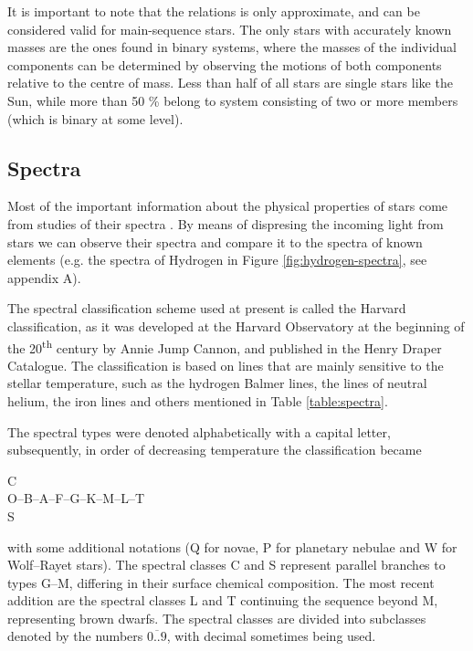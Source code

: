 It is important to note that the relations is only approximate, and can be considered valid for main-sequence stars. The only stars with accurately known masses are the ones found in binary systems, where the masses of the individual components
can be determined by observing the motions of both components relative to the centre of mass. Less than half of all stars are single stars like the Sun, while more than 50 \% belong to system consisting of two or more members (which is binary at some level). 


\subsection{Spectra}

Most of the important information about the physical properties of stars come from studies of their spectra \citep{Karttunen2017}. By means of dispresing the incoming light from stars we can observe their spectra and compare it to the spectra of known elements (e.g. the spectra of Hydrogen in Figure \ref{fig:hydrogen-spectra}, see appendix A). 

The spectral classification scheme used at present is called the Harvard classification, as it was developed at the Harvard Observatory at the beginning of the 20\textsuperscript{th} century by Annie Jump Cannon, and published in the Henry Draper Catalogue. The classification is based on lines that are mainly sensitive to the stellar temperature, such as the hydrogen Balmer lines, the lines of neutral helium, the iron lines and others mentioned in Table \ref{table:spectra}.

The spectral types were denoted alphabetically with a capital letter, subsequently, in order of decreasing temperature the classification became 
\begin{center}
C\\
O–B–A–F–G–K–M–L–T\\
S\\
\end{center}
with some additional notations (Q for novae, P for planetary nebulae and W for Wolf–Rayet stars). The spectral classes C and S represent parallel branches to types G–M, differing in their surface chemical composition. The most recent addition
are the spectral classes L and T continuing the sequence beyond M, representing brown dwarfs. The spectral classes are divided into subclasses denoted by the numbers $\overline{0..9}$, with decimal sometimes being used.

